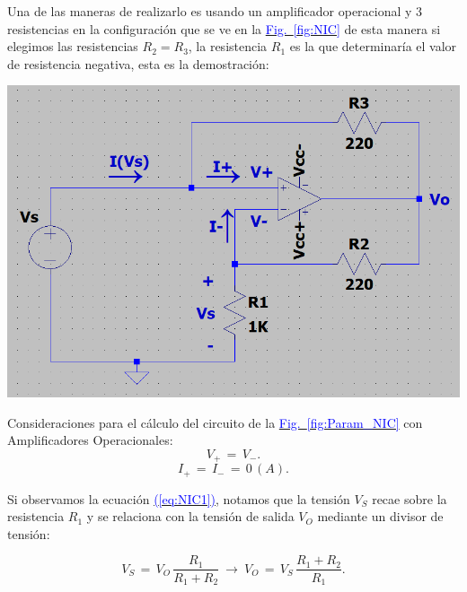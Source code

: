 \documentclass[12pt,a4paper]{report} %
\newcommand{\fref}[1]{\hyperref[#1]{\textcolor{blue}{Fig.~\ref*{#1}}}}
\newcommand{\eref}[1]{\hyperref[#1]{\textcolor{blue}{(\ref*{#1})}}}
\newcommand{\fref}[1]{\hyperref[#1]{\textcolor{blue}{\textit{Fig.~\ref*{#1}}}}}
\newcommand{\eref}[1]{\hyperref[#1]{\textcolor{blue}{\textit{(\ref*{#1})}}}}
\begin{document}
	\newpage
	
	Una de las maneras de realizarlo es usando un amplificador operacional y 3 resistencias en la configuración que se ve en la \fref{fig:NIC} de esta manera si elegimos las resistencias $R_2=R_3$, la resistencia $R_1$ es la que determinaría el valor de resistencia negativa, esta es la demostración:
	
	\vspace{0.5cm}
	
	\begin{center}
	\begin{multicols}{2}
		\centering
		\includegraphics[width=\columnwidth]{demotracion_NIC.png}
		\label{fig:Param_NIC}
	
		\columnbreak
		
		Consideraciones para el cálculo del circuito de la \fref{fig:Param_NIC} con Amplificadores Operacionales:\\
		\begin{equation}
			V_+\,=\,V_-.
			\label{eq:NIC1}
		\end{equation}
		\begin{equation}
			I_+\,=\,I_-\,=\,0\,(A).
			\label{eq:NIC2}
		\end{equation}
	\end{multicols}
	\end{center}
	
	\noindent Si observamos la ecuación \eref{eq:NIC1}, notamos que la tensión $V_S$ recae sobre la resistencia $R_1$ y se relaciona con la tensión de salida $V_O$ mediante un divisor de tensión:
	
	\begin{equation}
		V_S\,=\,V_O\,\frac{R_1}{R_1 + R_2}\:\longrightarrow\:V_O\,=\,V_S\,\frac{R_1 + R_2}{R_1}.
		\label{eq:NIC3}
	\end{equation}\smallskip
	
\end{document}
